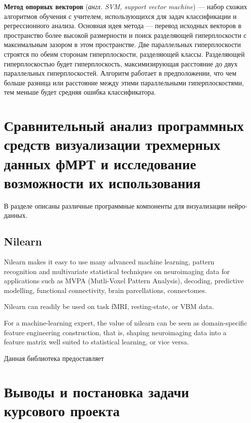 \textbf{Метод опорных векторов} (\emph {англ. SVM, support vector machine}) — набор схожих алгоритмов обучения с учителем, использующихся для задач классификации и регрессионного анализа. Основная идея метода — перевод исходных векторов в пространство более высокой размерности и поиск разделяющей гиперплоскости с максимальным зазором в этом пространстве. Две параллельных гиперплоскости строятся по обеим сторонам гиперплоскости, разделяющей классы. Разделяющей гиперплоскостью будет гиперплоскость, максимизирующая расстояние до двух параллельных гиперплоскостей. Алгоритм работает в предположении, что чем больше разница или расстояние между этими параллельными гиперплоскостями, тем меньше будет средняя ошибка классификатора.




\section{Сравнительный анализ программных средств визуализации трехмерных данных фМРТ и исследование возможности их использования}
\begin{annotation}
	В разделе описаны  различные программные компоненты для визуализации нейро-данных.
\end{annotation}

\subsection{Nilearn}
Nilearn makes it easy to use many advanced machine learning, pattern recognition and multivariate statistical techniques on neuroimaging data for applications such as MVPA (Mutli-Voxel Pattern Analysis), decoding, predictive modelling, functional connectivity, brain parcellations, connectomes.

Nilearn can readily be used on task fMRI, resting-state, or VBM data.

For a machine-learning expert, the value of nilearn can be seen as domain-specific feature engineering construction, that is, shaping neuroimaging data into a feature matrix well suited to statistical learning, or vice versa.

Данная библиотека предоставляет 



\section{Выводы и постановка задачи курсового проекта}

